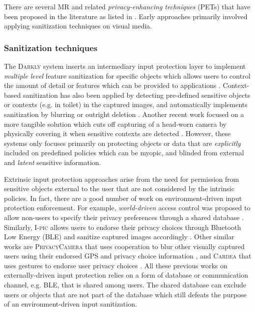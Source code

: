 There are several MR and related \textit{privacy-enhancing techniques} (PETs) that have been proposed in the literature as listed in \cite{deguzman2018security}. Early approaches primarily involved applying sanitization techniques on visual media. %

\subsubsection{Sanitization techniques} The \textsc{Darkly} system inserts an intermediary input protection layer to implement \textit{multiple level} feature sanitization for specific objects which allows users to control the amount of detail or features which can be provided to applications \cite{jana2013scanner}. %
Context-based sanitization has also been applied by detecting pre-defined sensitive objects or contexts (e.g. in toilet) in the captured images, and automatically implements sanitization by blurring or outright deletion \cite{zarepour2016context}. Another recent work focused on a more tangible solution which cuts off capturing of a head-worn camera by physically covering it when sensitive contexts are detected \cite{steilPrivaceye2018}. However, these systems only focuses primarily on protecting objects or data that are \textit{explicitly} included on predefined policies which can be myopic, and blinded from external and \textit{latent} sensitive information.

Extrinsic input protection approaches arise from the need for permission from sensitive objects external to the user that are not considered by the intrinsic policies. In fact, there are a good number of work on environment-driven input protection enforcement. For example, \textit{world-driven} access control was proposed to allow non-users to specify their privacy preferences through a shared database \cite{roesner2014world}. Similarly, \textsc{I-pic} allows users to endorse their privacy choices through Bluetooth Low Energy (BLE) and sanitize captured images accordingly \cite{aditya2016pic}. Other similar works are \textsc{PrivacyCamera} that uses cooperation to blur other visually captured users using their endorsed GPS and privacy choice information \cite{li2016privacycamera}, and \textsc{Cardea} that uses gestures to endorse user privacy choices \cite{shu2016cardea}. All these previous works on externally-driven input protection relies on a form of database or communication channel, e.g. BLE, that is shared among users. The shared database can exclude users or objects that are not part of the database which still defeats the purpose of an environment-driven input sanitization.

